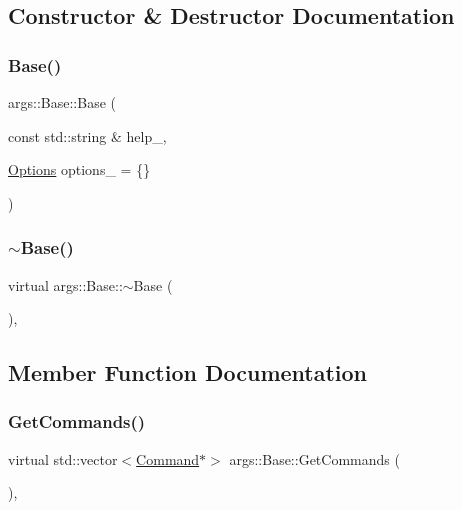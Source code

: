 \subsection{Constructor \& Destructor Documentation}
\mbox{\label{classargs_1_1_base_a70f9c2513df7df1dcf6cab427bb77dce}} 
\subsubsection{\texorpdfstring{Base()}{Base()}}
{\footnotesize\ttfamily args\+::\+Base\+::\+Base (\begin{DoxyParamCaption}\item[{const std\+::string \&}]{help\+\_\+,  }\item[{\hyperlink{namespaceargs_aa530c0f95194aa275f49a5f299ac9e77}{Options}}]{options\+\_\+ = {\ttfamily \{\}} }\end{DoxyParamCaption})\hspace{0.3cm}{\ttfamily [inline]}}

\mbox{\label{classargs_1_1_base_a30b61d4bac37578b989df06713781de9}} 
\subsubsection{\texorpdfstring{$\sim$\+Base()}{~Base()}}
{\footnotesize\ttfamily virtual args\+::\+Base\+::$\sim$\+Base (\begin{DoxyParamCaption}{ }\end{DoxyParamCaption})\hspace{0.3cm}{\ttfamily [inline]}, {\ttfamily [virtual]}}



\subsection{Member Function Documentation}
\mbox{\label{classargs_1_1_base_a8b41df1247be5545f95279608d835bf2}} 
\subsubsection{\texorpdfstring{Get\+Commands()}{GetCommands()}}
{\footnotesize\ttfamily virtual std\+::vector$<$\hyperlink{classargs_1_1_command}{Command}$\ast$$>$ args\+::\+Base\+::\+Get\+Commands (\begin{DoxyParamCaption}{ }\end{DoxyParamCaption})\hspace{0.3cm}{\ttfamily [inline]}, {\ttfamily [virtual]}}



